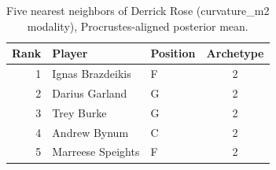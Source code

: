 \begin{table}[htbp]
  \centering\small
  \begin{tabular}{rllc}
    \toprule
    Rank & Player & Position & Archetype \\
    \midrule
    1 & Ignas Brazdeikis & F & 2 \\
    2 & Darius Garland & G & 2 \\
    3 & Trey Burke & G & 2 \\
    4 & Andrew Bynum & C & 2 \\
    5 & Marreese Speights & F & 2 \\
    \bottomrule
  \end{tabular}
  \caption{Five nearest neighbors of Derrick Rose (curvature_m2 modality), Procrustes-aligned posterior mean.}
  \label{tab:Derrick_Rose_neighbors_curvature_m2}
\end{table}

